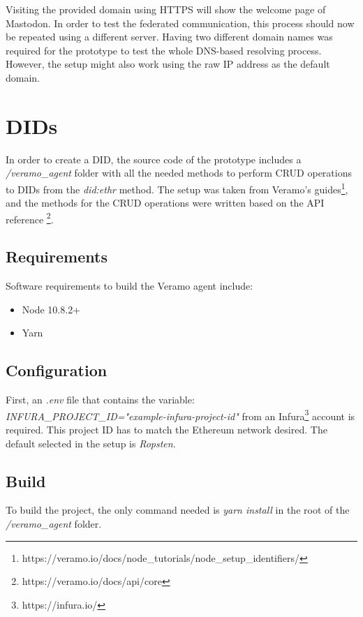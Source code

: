 Visiting the provided domain using HTTPS will show the welcome page of Mastodon. In order to test the federated communication, this process should now be repeated using a different server. Having two different domain names was required for the prototype to test the whole DNS-based resolving process. However, the setup might also work using the raw IP address as the default domain. 


\section{DIDs}

In order to create a DID, the source code of the prototype includes a \emph{/veramo\_agent} folder with all the needed methods to perform CRUD operations to DIDs from the \emph{did:ethr} method. The setup was taken from Veramo's guides\footnote{https://veramo.io/docs/node\_tutorials/node\_setup\_identifiers/}, and the methods for the CRUD operations were written based on the API reference \footnote{https://veramo.io/docs/api/core}. 

\subsection{Requirements}

Software requirements to build the Veramo agent include: 
\begin{itemize}
  \item Node 10.8.2+
  \item Yarn
\end{itemize}

\subsection{Configuration}
First, an \emph{.env} file that contains the variable: \emph{INFURA\_PROJECT\_ID="example-infura-project-id"} from an Infura\footnote{https://infura.io/} account is required. This project ID has to match the Ethereum network desired. The default selected in the setup is \emph{Ropsten}.

\subsection{Build}
To build the project, the only command needed is \emph{yarn install} in the root of the \emph{/veramo\_agent} folder. 

